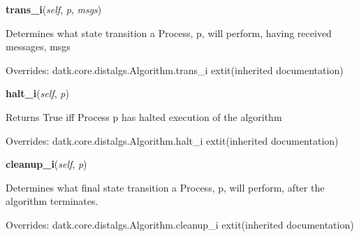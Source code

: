     \vspace{0.5ex}

\hspace{.8\funcindent}\begin{boxedminipage}{\funcwidth}

    \raggedright \textbf{trans\_i}(\textit{self}, \textit{p}, \textit{msgs})

\setlength{\parskip}{2ex}
    Determines what state transition a Process, p, will perform, having 
    received messages, msgs

\setlength{\parskip}{1ex}
      Overrides: datk.core.distalgs.Algorithm.trans\_i 	extit{(inherited documentation)}

    \end{boxedminipage}

    \vspace{0.5ex}

\hspace{.8\funcindent}\begin{boxedminipage}{\funcwidth}

    \raggedright \textbf{halt\_i}(\textit{self}, \textit{p})

\setlength{\parskip}{2ex}
    Returns True iff Process p has halted execution of the algorithm

\setlength{\parskip}{1ex}
      Overrides: datk.core.distalgs.Algorithm.halt\_i 	extit{(inherited documentation)}

    \end{boxedminipage}

    \vspace{0.5ex}

\hspace{.8\funcindent}\begin{boxedminipage}{\funcwidth}

    \raggedright \textbf{cleanup\_i}(\textit{self}, \textit{p})

\setlength{\parskip}{2ex}
    Determines what final state transition a Process, p, will perform, 
    after the algorithm terminates.

\setlength{\parskip}{1ex}
      Overrides: datk.core.distalgs.Algorithm.cleanup\_i 	extit{(inherited documentation)}

    \end{boxedminipage}

    \vspace{0.5ex}

